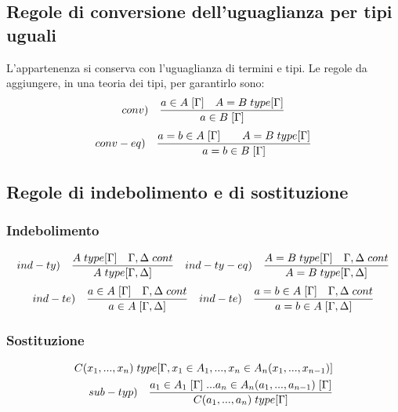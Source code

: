 \subsection{Regole di conversione dell'uguaglianza per tipi uguali}
\label{subsec:conversione-uguaglianza}
L'appartenenza si conserva con l'uguaglianza di termini e tipi. Le regole da aggiungere, in una teoria dei tipi, per garantirlo sono:
\[ conv) \quad \frac{a \in A\hspace{0.1cm}[\Gamma] \quad A=B\hspace{0.1cm}type[\Gamma]}{a \in B\hspace{0.1cm}[\Gamma]} \]
\[ conv-eq) \quad \frac{a=b \in A\hspace{0.1cm}[\Gamma] \qquad A=B\hspace{0.1cm}type[\Gamma]}{a=b \in B\hspace{0.1cm}[\Gamma]} \]
\subsection{Regole di indebolimento e di sostituzione}
\label{subsec:indebolimento-sostituzione}
\subsubsection{Indebolimento}
\label{subsec:indebolimento}
\[ ind-ty) \quad \frac{A\hspace{0.1cm}type[\Gamma] \quad \Gamma,\Delta\hspace{0.1cm}cont}{A\hspace{0.1cm}type[\Gamma,\Delta]} \quad ind-ty-eq) \quad \frac{A=B\hspace{0.1cm}type[\Gamma] \quad \Gamma,\Delta\hspace{0.1cm}cont}{A=B\hspace{0.1cm}type[\Gamma,\Delta]} \]
\[ ind-te) \quad \frac{a \in A\hspace{0.1cm}[\Gamma] \quad \Gamma,\Delta\hspace{0.1cm}cont}{a \in A\hspace{0.1cm}[\Gamma,\Delta]} \quad ind-te) \quad \frac{a=b \in A\hspace{0.1cm}
[\Gamma] \quad \Gamma,\Delta\hspace{0.1cm}cont}{a=b \in A\hspace{0.1cm}[\Gamma,\Delta]} \]
\subsubsection{Sostituzione}
\label{subsec:sostituzione}
\begin{equation}
\begin{split}
C(x_1,...,x_n)\hspace{0.1cm}type[\Gamma, x_1 \in A_1,...,x_n \in A_n(x_1,...,x_{n-1})] \\ sub-typ) \quad \frac{a_1 \in A_1\hspace{0.1cm}[\Gamma]\hspace{0.1cm}...a_n \in A_n(a_1,...,a_{n-1})\hspace{0.1cm}[\Gamma]}{ C(a_1,...,a_n)\hspace{0.1cm}type[\Gamma]}
\end{split}
\end{equation}

